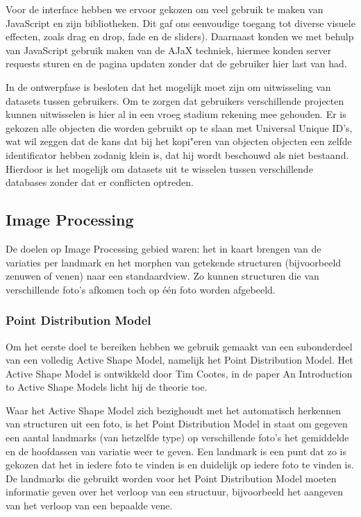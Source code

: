 Voor de interface hebben we ervoor gekozen om veel gebruik te maken van JavaScript en zijn bibliotheken. Dit gaf ons eenvoudige toegang tot diverse visuele effecten, zoals drag en drop, fade en de sliders). Daarnaast konden we met behulp van JavaScript gebruik maken van de AJaX techniek, hiermee konden server requests sturen en de pagina updaten zonder dat de gebruiker hier last van had.

In de ontwerpfase is besloten dat het mogelijk moet zijn om uitwisseling van datasets tussen gebruikers. Om te zorgen dat gebruikers verschillende projecten kunnen uitwisselen is hier al in een vroeg stadium rekening mee gehouden. Er is gekozen alle objecten die worden gebruikt op te slaan met Universal Unique ID's, wat wil zeggen dat de kans dat bij het kopi"{e}ren van objecten objecten een zelfde identificator hebben zodanig klein is, dat hij wordt beschouwd als niet bestaand. Hierdoor is het mogelijk om datasets uit te wisselen tussen verschillende databases zonder dat er conflicten optreden.

\subsection{Image Processing}
De doelen op Image Processing gebied waren: het in kaart brengen van de variaties per landmark en het morphen van getekende structuren (bijvoorbeeld zenuwen of venen) naar een standaardview. Zo kunnen structuren die van verschillende foto's afkomen toch op \'{e}\'{e}n foto worden afgebeeld.

\subsubsection{Point Distribution Model}
Om het eerste doel te bereiken hebben we gebruik gemaakt van een subonderdeel van een volledig Active Shape Model, namelijk het Point Distribution Model. Het Active Shape Model is ontwikkeld door Tim Cootes, in de paper An Introduction to Active Shape Models licht hij de theorie toe.\cite{introASM}

Waar het Active Shape Model zich bezighoudt met het automatisch herkennen van structuren uit een foto, is het Point Distribution Model\cite{pdm} in staat om gegeven een aantal landmarks (van hetzelfde type) op verschillende foto's het gemiddelde en de hoofdassen van variatie weer te geven. Een landmark is een punt dat zo is gekozen dat het in iedere foto te vinden is en duidelijk op iedere foto te vinden is. De landmarks die gebruikt worden voor het Point Distribution Model moeten informatie geven over het verloop van een structuur, bijvoorbeeld het aangeven van het verloop van een bepaalde vene.

